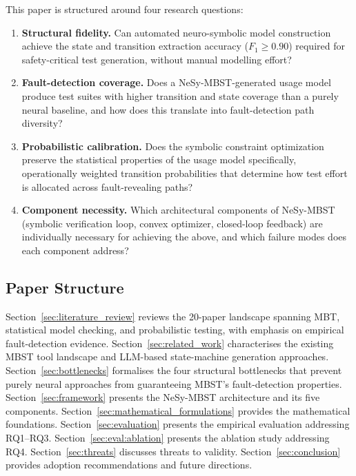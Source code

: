This paper is structured around four research questions:

\begin{enumerate}
    \item[\textbf{RQ1}] \textbf{Structural fidelity.}  Can automated neuro-symbolic model construction achieve the state and transition extraction accuracy ($F_1 \geq 0.90$) required for safety-critical test generation, without manual modelling effort?

    \item[\textbf{RQ2}] \textbf{Fault-detection coverage.}  Does a NeSy-MBST-generated usage model produce test suites with higher transition and state coverage than a purely neural baseline, and how does this translate into fault-detection path diversity?

    \item[\textbf{RQ3}] \textbf{Probabilistic calibration.}  Does the symbolic constraint optimization preserve the statistical properties of the usage model specifically, operationally weighted transition probabilities that determine how test effort is allocated across fault-revealing paths?

    \item[\textbf{RQ4}] \textbf{Component necessity.}  Which architectural components of NeSy-MBST (symbolic verification loop, convex optimizer, closed-loop feedback) are individually necessary for achieving the above, and which failure modes does each component address?
\end{enumerate}

\subsection*{Paper Structure}

Section~\ref{sec:literature_review} reviews the 20-paper landscape spanning MBT, statistical model checking, and probabilistic testing, with emphasis on empirical fault-detection evidence.  Section~\ref{sec:related_work} characterises the existing MBST tool landscape and LLM-based state-machine generation approaches.  Section~\ref{sec:bottlenecks} formalises the four structural bottlenecks that prevent purely neural approaches from guaranteeing MBST's fault-detection properties.  Section~\ref{sec:framework} presents the NeSy-MBST architecture and its five components.  Section~\ref{sec:mathematical_formulations} provides the mathematical foundations.  Section~\ref{sec:evaluation} presents the empirical evaluation addressing RQ1--RQ3.  Section~\ref{sec:eval:ablation} presents the ablation study addressing RQ4.  Section~\ref{sec:threats} discusses threats to validity.  Section~\ref{sec:conclusion} provides adoption recommendations and future directions.
